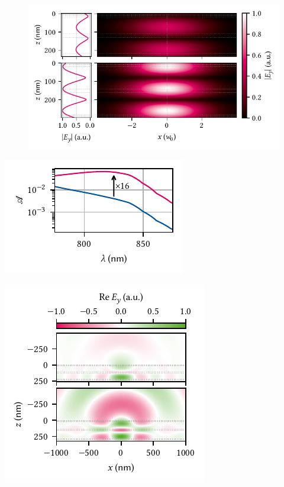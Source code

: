 \begin{figure}
    \centering
    \includegraphics{img/pdf/experiment/tmm_field}
    \caption[]{}
    \label{fig:exp:tmm:field}
\end{figure}

\begin{marginfigure}
    \centering
    \includegraphics{img/pdf/experiment/tmm_absorptance}
    \caption[]{}
    \label{fig:exp:tmm:wavelengths}
\end{marginfigure}

\begin{marginfigure}
    \centering
    \includegraphics{img/pdf/experiment/tmm_green_opt_tgbg}
    \caption[]{}
    \label{fig:exp:tmm:green:opt:tgbg}
\end{marginfigure}

